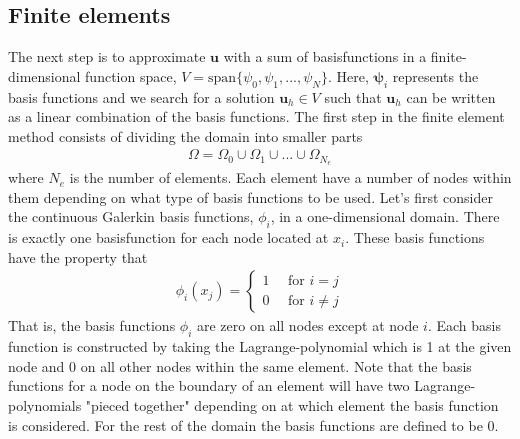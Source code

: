 \subsection{Finite elements}
The next step is to approximate $\mathbf{u}$ with a sum of basisfunctions in a finite-dimensional function space, $V = \text{span}\{\psi_0, \psi_1, ..., \psi_N\}$. Here, $\mathbf{\psi}_i$ represents the basis functions and we search for a solution $\mathbf{u}_h \in V$ such that $\mathbf{u}_h$ can be written as a linear combination of the basis functions. 
The first step in the finite element method consists of dividing the domain into smaller parts
\begin{align*}
\Omega = \Omega_0 \cup \Omega_1 \cup ... \cup \Omega_{N_e}
\end{align*}
where $N_e$ is the number of elements. Each element have a number of nodes within them depending on what type of basis functions to be used. Let's first consider the continuous Galerkin basis functions, $\phi_i$, in a one-dimensional domain. There is exactly one basisfunction for each node located at $x_i$. These basis functions have the property that
\begin{align*}
\phi_i(x_j) = \begin{cases}
				1 \quad \text{ for } i=j \\
				0 \quad \text{ for } i\neq j
		 		\end{cases}
\end{align*}
That is, the basis functions $\phi_i$ are zero on all nodes except at node $i$. Each basis function is constructed by taking the Lagrange-polynomial which is 1 at the given node and 0 on all other nodes within the same element. Note that the basis functions for a node on the boundary of an element will have two Lagrange-polynomials "pieced together" depending on at which element the basis function is considered. For the rest of the domain the basis functions are defined to be 0. \\ \\

